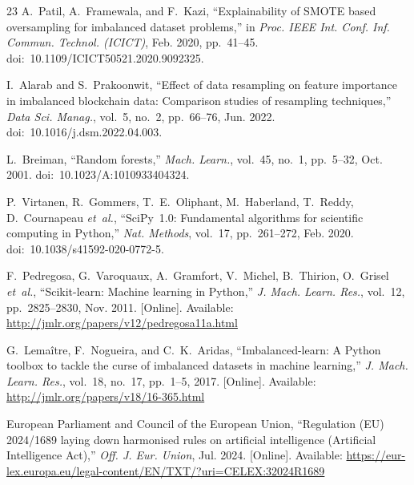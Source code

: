 \documentclass[conference,a4paper]{IEEEtran}
\begin{document}
\begin{thebibliography}{23}
A.~Patil, A.~Framewala, and F.~Kazi,
``Explainability of SMOTE based oversampling for imbalanced dataset
problems,''
in \emph{Proc. IEEE Int. Conf. Inf. Commun. Technol. (ICICT)},
Feb. 2020, pp.~41--45.
doi:~10.1109/ICICT50521.2020.9092325.

I.~Alarab and S.~Prakoonwit,
``Effect of data resampling on feature importance in imbalanced blockchain
data: Comparison studies of resampling techniques,''
\emph{Data Sci. Manag.}, vol.~5, no.~2, pp.~66--76, Jun. 2022.
doi:~10.1016/j.dsm.2022.04.003.

L.~Breiman,
``Random forests,''
\emph{Mach. Learn.}, vol.~45, no.~1, pp.~5--32, Oct. 2001.
doi:~10.1023/A:1010933404324.

P.~Virtanen, R.~Gommers, T.~E.~Oliphant, M.~Haberland, T.~Reddy,
D.~Cournapeau \emph{et~al.},
``SciPy~1.0: Fundamental algorithms for scientific computing in Python,''
\emph{Nat. Methods}, vol.~17, pp.~261--272, Feb. 2020.
doi:~10.1038/s41592-020-0772-5.

F.~Pedregosa, G.~Varoquaux, A.~Gramfort, V.~Michel, B.~Thirion,
O.~Grisel \emph{et~al.},
``Scikit-learn: Machine learning in Python,''
\emph{J. Mach. Learn. Res.}, vol.~12, pp.~2825--2830, Nov. 2011.
[Online]. Available: \url{http://jmlr.org/papers/v12/pedregosa11a.html}

G.~Lema\^{i}tre, F.~Nogueira, and C.~K.~Aridas,
``Imbalanced-learn: A Python toolbox to tackle the curse of imbalanced
datasets in machine learning,''
\emph{J. Mach. Learn. Res.}, vol.~18, no.~17, pp.~1--5, 2017.
[Online]. Available: \url{http://jmlr.org/papers/v18/16-365.html}

European Parliament and Council of the European Union,
``Regulation (EU) 2024/1689 laying down harmonised rules on artificial
intelligence (Artificial Intelligence Act),''
\emph{Off. J. Eur. Union}, Jul. 2024. [Online]. Available:
\url{https://eur-lex.europa.eu/legal-content/EN/TXT/?uri=CELEX:32024R1689}

\end{thebibliography}

\end{document}
